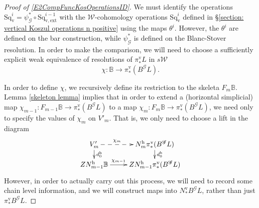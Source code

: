 \documentclass[11pt]{amsart} \renewcommand{\baselinestretch}{1.2}
\theoremstyle{plain}
\theoremstyle{definition}
\DeclareMathOperator{\im}{im}
\renewcommand{\to}{\longrightarrow}
\newcommand{\scrG}{\mathscr{G}}
\newcommand{\calw}{\mathcal{W}}
\newcommand{\citeBOX}[2][]{\cite[\mbox{#1}]{#2}}
\newcommand{\BSW}{{\scrG}}
\newcommand{\BSWres}{B^\BSW}%
\newcommand{\vExtCohOp}{\mathrm{Sq}_\mathrm{v,ext}}
\newcommand{\Id}{\mathrm{id}}
\newcommand{\uver}{^\mathrm{v}}
\newcommand{\uhor}{^\mathrm{h}}
\newcommand{\dver}{_\mathrm{v}}
\newcommand{\Sqv}{\mathrm{Sq}\dver}
\begin{document}
\begin{Operations in composite functor spectral sequences}
\begin{proof}[Proof of \ref{E2CompFuncKosOperationsID}]
We must identify the operations $\Sqv^i=\psi_\BSW^*\circ\vExtCohOp^{i-1}$ with the $\calw$-cohomology operations $\Sqv^i$ defined in \S\ref{section: vertical Koszul operations n positive} using the maps $\theta^i$. However, the $\theta^i$ are defined on the bar construction, while $\psi_\BSW^*$ is defined on the Blanc-Stover resolution. In order to make the comparison, we will need to choose a sufficiently explicit weak equivalence of resolutions of $\pi\uver_* L$ in $s\calw$
\[\chi:\mathbb{B}\to \pi\uver_*(\BSWres L).\]




In order to define $\chi$, we recursively define its restriction to the skeleta $F_m\mathbb{B}$. Lemma \ref{skeleton lemma} implies that in order to extend a (horizontal simplicial) map $\chi_{m-1}:F_{m-1}\mathbb{B}\to \pi\uver_*(\BSWres L)$ to a map $\chi_m:F_m\mathbb{B}\to \pi\uver_*(\BSWres L)$, we need only to specify the values of $\chi_m$ on $V'_m$. That is, we only need to choose a lift in the diagram
\[\xymatrix@R=4mm{
V'_m\ar@{-->}[r]^-{\chi_m}
\ar[d]^-{d\uhor_0}
&%
N\uhor_m\pi\uver_*(\BSWres L)\ar[d]^-{d\uhor_0}
\\%
ZN\uhor_{m-1}\mathbb{B}\ar[r]^-{\chi_{m-1}}
&%
ZN\uhor_{m-1}\pi\uver_*(\BSWres L)%
}\]
However, in order to actually carry out this process, we will need to record some chain level information, and we will  construct maps into $N\uver_*B^{\BSW}L$, rather than just $\pi\uver_*B^{\BSW}L$. 


\end{proof}
\end{Operations in composite functor spectral sequences}
\end{document}
